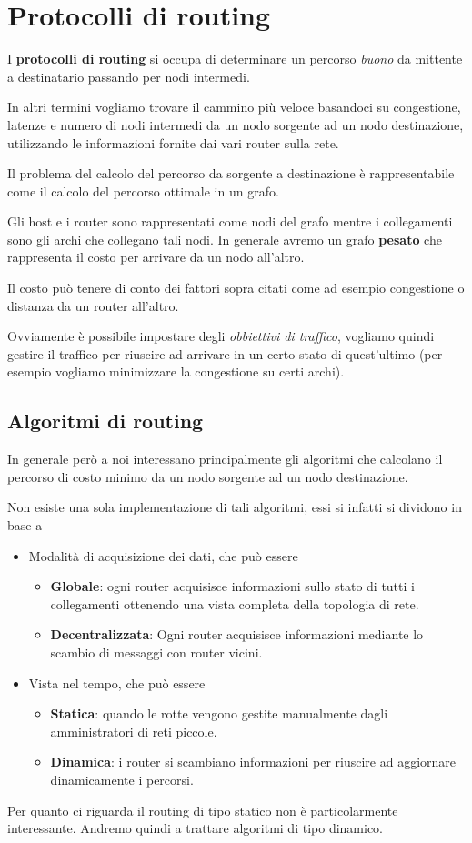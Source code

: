\section{Protocolli di routing}
I \textbf{protocolli di routing} si occupa di determinare un percorso
\emph{buono} da mittente a destinatario passando per nodi intermedi.

In altri termini vogliamo trovare il cammino più veloce basandoci
su congestione, latenze e numero di nodi intermedi da un nodo sorgente 
ad un nodo destinazione, utilizzando le informazioni fornite dai vari
router sulla rete.

Il problema del calcolo del percorso da sorgente a destinazione è 
rappresentabile come il calcolo del percorso ottimale in un grafo.

Gli host e i router sono rappresentati come nodi del grafo mentre i
collegamenti sono gli archi che collegano tali nodi. In generale avremo
un grafo \textbf{pesato} che rappresenta il costo per arrivare da un
nodo all'altro.

Il costo può tenere di conto dei fattori sopra citati come ad esempio
congestione o distanza da un router all'altro.

Ovviamente è possibile impostare degli \emph{obbiettivi di traffico},
vogliamo quindi gestire il traffico per riuscire ad arrivare in un
certo stato di quest'ultimo (per esempio vogliamo minimizzare la 
congestione su certi archi).

\subsection{Algoritmi di routing}
In generale però a noi interessano principalmente gli algoritmi che
calcolano il percorso di costo minimo da un nodo sorgente ad un nodo
destinazione.

Non esiste una sola implementazione di tali algoritmi, essi si infatti
si dividono in base a
\begin{itemize}
	\item Modalità di acquisizione dei dati, che può essere
		\begin{itemize}
			\item \textbf{Globale}: ogni router acquisisce informazioni
				sullo stato di tutti i collegamenti ottenendo una
				vista completa della topologia di rete.
			\item \textbf{Decentralizzata}: Ogni router acquisisce
				informazioni mediante lo scambio di messaggi con 
				router vicini.
		\end{itemize}
	\item Vista nel tempo, che può essere
		\begin{itemize}
			\item \textbf{Statica}: quando le rotte vengono gestite
				manualmente dagli amministratori di reti piccole.
			\item \textbf{Dinamica}: i router si scambiano informazioni
				per riuscire ad aggiornare dinamicamente i percorsi.
		\end{itemize}
\end{itemize}
Per quanto ci riguarda il routing di tipo statico non è particolarmente
interessante. Andremo quindi a trattare algoritmi di tipo dinamico.

